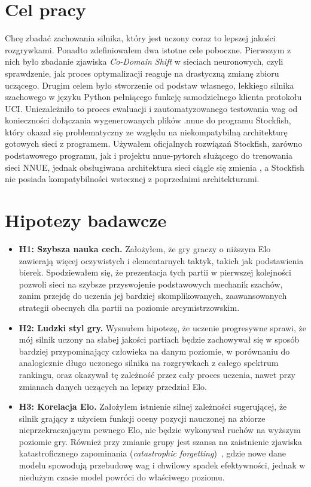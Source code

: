 \documentclass[12pt,a4paper]{report}
\begin{document}
\section{Cel pracy}

Chcę zbadać zachowania silnika, który jest uczony coraz to lepszej jakości rozgrywkami. Ponadto zdefiniowałem dwa istotne cele poboczne. Pierwszym z nich było zbadanie zjawiska \textit{Co-Domain Shift} w sieciach neuronowych, czyli sprawdzenie, jak proces optymalizacji reaguje na drastyczną zmianę zbioru uczącego. Drugim celem było stworzenie od podstaw własnego, lekkiego silnika szachowego w języku Python pełniącego funkcję samodzielnego klienta protokołu UCI. Uniezależniło to proces ewaluacji i zautomatyzowanego testowania wag od konieczności dołączania wygenerowanych plików .nnue do programu Stockfish, który okazał się problematyczny ze względu na niekompatybilną architekturę gotowych sieci z programem. Używałem oficjalnych rozwiązań Stockfish, zarówno podstawowego programu, jak i projektu nnue-pytorch służącego do trenowania sieci NNUE, jednak obsługiwana architektura sieci ciągle się zmienia \cite{nnue.md}, a Stockfish nie posiada kompatybilności wstecznej z poprzednimi architekturami.

\section{Hipotezy badawcze}

\begin{itemize}
    \item \textbf{H1: Szybsza nauka cech.} Założyłem, że gry graczy o niższym Elo zawierają więcej oczywistych i elementarnych taktyk, takich jak podstawienia bierek. Spodziewałem się, że prezentacja tych partii w pierwszej kolejności pozwoli sieci na szybsze przyswojenie podstawowych mechanik szachów, zanim przejdę do uczenia jej bardziej skomplikowanych, zaawansowanych strategii obecnych dla partii na poziomie arcymistrzowskim.
    \item \textbf{H2: Ludzki styl gry.} Wysnułem hipotezę, że uczenie progresywne sprawi, że mój silnik uczony na słabej jakości partiach będzie zachowywał się w sposób bardziej przypominający człowieka na danym poziomie, w porównaniu do analogicznie długo uczonego silnika na rozgrywkach z całego spektrum rankingu, oraz okazywał tę zależność przez cały proces uczenia, nawet przy zmianach danych uczących na lepszy przedział Elo.
    \item \textbf{H3: Korelacja Elo.} Założyłem istnienie silnej zależności sugerującej, że silnik grający z użyciem funkcji oceny pozycji nauczonej na zbiorze nieprzekraczającym pewnego Elo, nie będzie wykonywał ruchów na wyższym poziomie gry. Również przy zmianie grupy jest szansa na zaistnienie zjawiska katastroficznego zapominania (\textit{catastrophic forgetting})~\cite{mccloskey1989catastrophic}, gdzie nowe dane modelu spowodują przebudowę wag i chwilowy spadek efektywności, jednak w niedużym czasie model powróci do właściwego poziomu.
\end{itemize}
\end{document}
